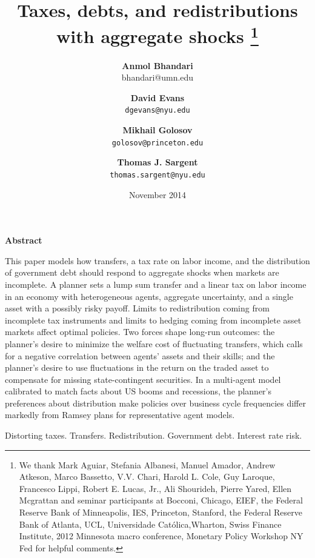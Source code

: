 \documentclass[thmsb,11pt]{article}
\begin{document}
\author{\textbf{Anmol Bhandari}\\bhandari@umn.edu \and \textbf{David Evans} \\ \texttt{dgevans@nyu.edu} \and \textbf{Mikhail Golosov}\\\texttt{golosov@princeton.edu} \and \textbf{Thomas J. Sargent} \\ \texttt{thomas.sargent@nyu.edu}
}
\title{\textbf{Taxes, debts,  and redistributions with aggregate shocks%
\thanks{%
We thank Mark Aguiar, Stefania Albanesi, Manuel Amador,  Andrew Atkeson, Marco Bassetto, V.V. Chari, Harold
L. Cole, Guy Laroque, Francesco Lippi, Robert E. Lucas, Jr., Ali Shourideh, Pierre Yared, Ellen Mcgrattan and seminar
participants at Bocconi, Chicago, EIEF, the Federal Reserve Bank of
Minneapolis, IES, Princeton, Stanford, the Federal Reserve Bank of Atlanta, UCL, Universidade Cat\'{o}lica,Wharton, Swiss Finance Institute, 2012
Minnesota macro conference, Monetary Policy Workshop NY Fed for helpful
comments.}}}
\date{November 2014}
\maketitle
\begin{center}
\textbf{Abstract}
\end{center}

This paper models how transfers, a tax rate on labor income, and  the distribution of government debt should
respond to aggregate shocks when markets are incomplete. A planner sets a lump sum transfer and a linear tax on labor income
in an economy with heterogeneous agents, aggregate uncertainty, and a single asset with a possibly risky payoff. Limits to redistribution coming from incomplete  tax instruments and limits to hedging coming from incomplete  asset markets affect optimal policies.
Two forces shape long-run outcomes: the planner's desire to minimize the welfare cost of fluctuating transfers, which calls for a negative correlation between
agents' assets and their skills; and the planner's desire to use fluctuations in
the return on the traded asset to compensate for missing state-contingent securities.  In a multi-agent model calibrated to match facts about  US booms and recessions,
the planner's preferences about distribution  make  policies over business cycle frequencies  differ markedly from
Ramsey plans for representative agent  models.

\medskip


\bigskip
{}Distorting taxes. Transfers. Redistribution.  Government debt.  Interest rate risk.
\end{document}
